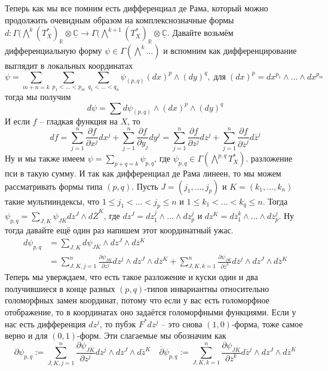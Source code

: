 Теперь как мы все помним есть дифференциал де Рама, который можно продолжить
очевидным образом на комплекснозначные формы $d:\Gamma(\bigwedge^k(T^*_X)_{
\mathbb R}\otimes\underline{\mathbb C}\rightarrow\Gamma(\bigwedge^{k+1}(T^*_X)_{
\mathbb R}\otimes\underline{\mathbb C}$. Давайте возьмём дифференциальную форму
$\psi\in\Gamma(\bigwedge^k\ldots)$ и вспомним как дифференцирование выглядит в
локальных координатах
\[\psi=\sum_{m+n=k}\sum_{p_1<\ldots<p_m}\sum_{q_1<\ldots<q_n}\psi_{(p,q)}(dx)^p\wedge(dy)^q,\;\text{для}\;(dx)^p=dx^{p_1}\wedge\ldots\wedge dx^{p_m}\]
тогда мы получим
\[d\psi=\sum d\psi_{(p,q)}\wedge (dx)^p\wedge (dy)^q\]
И если $f$ – гладкая функция на $X$, то
\[df=\sum_{j=1}^n\frac{\partial f}{\partial x^j}dx^j+\sum_{j-1}^n\frac{\partial f}{\partial y_j}dy^j
=\sum_{j=1}^n\frac{\partial f}{\partial z^j}dz^j+\sum_{j=1}^n\frac{\partial f}{\partial\overline z^j}d\overline z^j\]
Ну и мы также имеем $\psi=\sum_{p+q=k}\psi_{p,q}$, где $\psi_{p,q}\in\Gamma(\bigwedge^{p,q}T^*_X)$.
разложение пси в такую сумму. И так как дифференциал де Рама линеен, то мы можем
рассматривать формы типа $(p,q)$. Пусть $J=(j_1,\ldots,j_p)$ и $K=(k_1,\ldots,k_n)$
такие мультииндексы, что $1\leq j_1<\ldots<j_p\leq n$ и $1\leq k_1<\ldots<k_q\leq n$.
Тогда $\psi_{p,q}=\sum_{J,K} \psi_{J\overline K}dz^J\wedge d\overline Z^K$, где
$dz^J=dz^j_1\wedge\ldots\wedge dz^j_p$ и $dz^K=d\overline z^k_1\wedge\ldots\wedge
d\overline z^j_p$. Ну тогда давайте ещё один раз напишем этот координатный ужас.
\begin{align*}
    d\psi_{p,q}&=\sum_{J,K}d\psi_{J\overline K}\wedge dz^J\wedge d\overline z^K\\&=
    \sum_{J,K,j=1}^n\frac{\partial \psi_{J\overline K}}{\partial z^j}dz^j\wedge
    dz^J\wedge d\overline z^K+\sum_{J,K,k=1}^n\frac{\partial \psi_{J\overline K}}
    {\partial\overline z^k}d\overline z^j\wedge dz^J\wedge d\overline z^K
\end{align*}
Теперь мы уверждаем, что есть такое разложение и куски один и два получившиеся
в конце разных $(p,q)$-типов инвариантны относительно голоморфных замен координат,
потому что если у вас есть голоморфное отображение, то в координатах оно задаётся
голоморфными функциями. Если у нас есть дифференция $dz^j$, то пубэк $F^*dz^j$ – это
снова $(1,0)$-форма, тоже самое верно и для $(0,1)$-форм. Эти слагаемые мы обозначим
как
\[\partial\psi_{p,q}:=\sum_{J,K,j=1}^n\frac{\partial \psi_{J\overline K}}{\partial z^j}dz^j\wedge
    dz^J\wedge d\overline z^K\quad\overline\partial\psi_{p,q}:=\sum_{J,K,k=1}^n\frac{\partial \psi_{J\overline K}}
    {\partial\overline z^k}d\overline z^j\wedge dz^J\wedge d\overline z^K
\]

